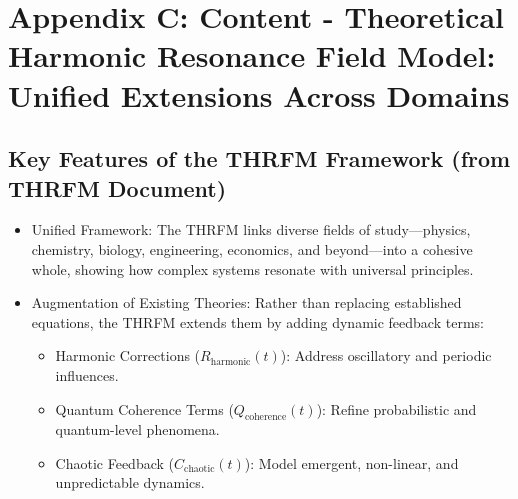 \documentclass[11pt,a4paper]{article}
\begin{document}
\section{Appendix C: Content - Theoretical Harmonic Resonance Field Model: Unified Extensions Across Domains}
\label{app:thrfm_extensions}

\subsection*{Key Features of the THRFM Framework (from THRFM Document)}
\begin{itemize}
\item Unified Framework: The THRFM links diverse fields of study—physics, chemistry, biology, engineering, economics, and beyond—into a cohesive whole, showing how complex systems resonate with universal principles.
\item Augmentation of Existing Theories: Rather than replacing established equations, the THRFM extends them by adding dynamic feedback terms:
\begin{itemize}
\item Harmonic Corrections ($R_{\text{harmonic}}(t)$): Address oscillatory and periodic influences.
\item Quantum Coherence Terms ($Q_{\text{coherence}}(t)$): Refine probabilistic and quantum-level phenomena.
\item Chaotic Feedback ($C_{\text{chaotic}}(t)$): Model emergent, non-linear, and unpredictable dynamics.
\end{itemize}
\end{itemize}
\end{document}
